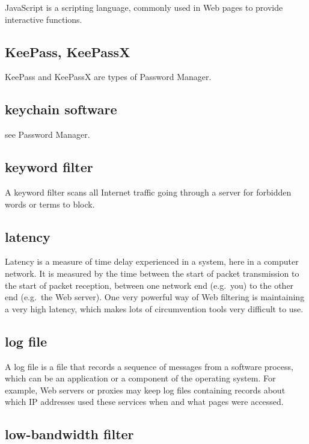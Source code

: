 JavaScript is a scripting language, commonly used in Web pages to
provide interactive functions.

\subsection{KeePass, KeePassX}

KeePass and KeePassX are types of Password Manager.

\subsection{keychain software}

see Password Manager.

\subsection{keyword filter}

A keyword filter scans all Internet traffic going through a server for
forbidden words or terms to block.

\subsection{latency}

Latency is a measure of time delay experienced in a system, here in a
computer network. It is measured by the time between the start of packet
transmission to the start of packet reception, between one network end
(e.g.~you) to the other end (e.g.~the Web server). One very powerful way
of Web filtering is maintaining a very high latency, which makes lots of
circumvention tools very difficult to use.

\subsection{log file}

A log file is a file that records a sequence of messages from a software
process, which can be an application or a component of the operating
system. For example, Web servers or proxies may keep log files
containing records about which IP addresses used these services when and
what pages were accessed.

\subsection{low-bandwidth filter}

